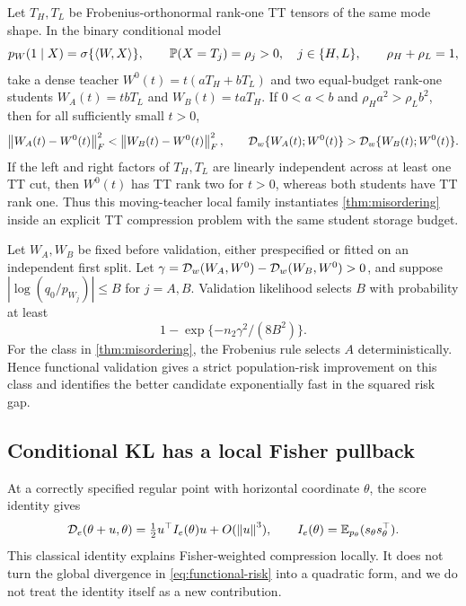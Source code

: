 \begin{proposition}
\label{prop:tt-misordering-paths}
Let \(T_H,T_L\) be Frobenius-orthonormal rank-one TT tensors of the same mode
shape.  In the binary conditional model
\[
 p_W(1\mid X)=\sigma\{\langle W,X\rangle\},\qquad
 \mathbb P(X=T_j)=\rho_j>0,\quad j\in\{H,L\},\qquad \rho_H+\rho_L=1,
\]
take a dense teacher
\(W^0(t)=t(aT_H+bT_L)\) and two equal-budget rank-one students
\(W_A(t)=tbT_L\) and \(W_B(t)=taT_H\).  If \(0<a<b\) and
\(\rho_Ha^2>\rho_Lb^2\), then for all sufficiently small \(t>0\),
\[
 \left\lVert W_A(t)-W^0(t)\right\rVert_F^2<\left\lVert W_B(t)-W^0(t)\right\rVert_F^2,
 \qquad
 \mathcal D_w\{W_A(t);W^0(t)\}>\mathcal D_w\{W_B(t);W^0(t)\}.
\]
If the left and right factors of \(T_H,T_L\) are linearly independent across
at least one TT cut, then \(W^0(t)\) has TT rank two for \(t>0\), whereas both
students have TT rank one. Thus this moving-teacher local family instantiates
\cref{thm:misordering} inside an explicit TT compression problem with the same
student storage budget.
\end{proposition}

\begin{corollary}
\label{cor:selection-gap}
Let \(W_A,W_B\) be fixed before validation, either prespecified or fitted on an independent first split. Let \(\gamma=\mathcal D_w(W_A,W^0)-\mathcal D_w(W_B,W^0)>0\), and suppose \(|\log(q_0/p_{W_j})|\le B\) for \(j=A,B\). Validation likelihood selects \(B\) with probability at least
\[
1-\exp\{-n_2\gamma^2/(8B^2)\}.
\]
For the class in \cref{thm:misordering}, the Frobenius rule selects \(A\) deterministically. Hence functional validation gives a strict population-risk improvement on this class and identifies the better candidate exponentially fast in the squared risk gap.
\end{corollary}

\subsection{Conditional KL has a local Fisher pullback}

At a correctly specified regular point with horizontal coordinate \(\theta\), the score identity gives
\begin{equation}
\mathcal D_e(\theta+u,\theta)
=\tfrac12u^\top I_e(\theta)u+O(\left\lVert u\right\rVert^3),
\qquad
I_e(\theta)=\mathbb E_{p_\theta}(s_\theta s_\theta^\top).
\label{eq:fisher-local}
\end{equation}
This classical identity explains Fisher-weighted compression locally. It does not turn the global divergence in \cref{eq:functional-risk} into a quadratic form, and we do not treat the identity itself as a new contribution.

